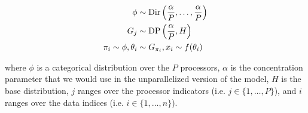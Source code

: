\begin{align*}
    \phi &\sim \mathrm{Dir}\left(\frac{\alpha}{P}, \ldots, \frac{\alpha}{P}\right) \\
     G_j &\sim \mathrm{DP}\left(\frac{\alpha}{P}, H\right) \\
    \pi_i \sim \phi,
    \theta_i &\sim G_{\pi_i},
    x_i \sim f(\theta_i)
\end{align*}

where $\phi$ is a categorical distribution over the $P$ processors,
$\alpha$ is the concentration parameter that we would use in the
unparallelized version of the model, $H$ is the base distribution, $j$
ranges over the processor indicators (i.e. $j \in \{1, \ldots, P\}$),
and $i$ ranges over the data indices (i.e. $i \in \{1, \ldots, n\}$).
